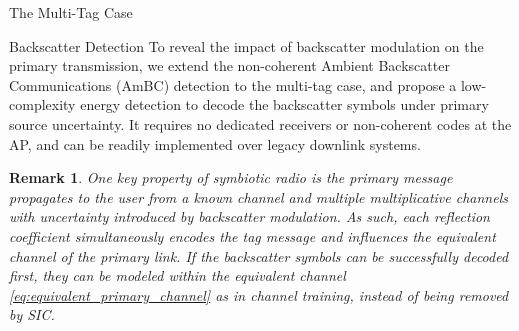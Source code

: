 \documentclass[journal]{IEEEtran}
\newtheorem{remark}{Remark}
\begin{document}
\begin{section}{The Multi-Tag Case}
		\begin{subsection}{Backscatter Detection}
			To reveal the impact of backscatter modulation on the primary transmission, we extend the non-coherent Ambient Backscatter Communications (AmBC) detection \cite{Qian2019} to the multi-tag case, and propose a low-complexity energy detection to decode the backscatter symbols under primary source uncertainty. It requires no dedicated receivers or non-coherent codes at the AP, and can be readily implemented over legacy downlink systems.

			\begin{remark}
				One key property of symbiotic radio is the primary message propagates to the user from a known channel and multiple multiplicative channels with uncertainty introduced by backscatter modulation. As such, each reflection coefficient simultaneously encodes the tag message and influences the equivalent channel of the primary link. If the backscatter symbols can be successfully decoded first, they can be modeled within the equivalent channel \eqref{eq:equivalent_primary_channel} as in channel training, instead of being removed by SIC.
			\end{remark}


\end{subsection}
\end{section}
\end{document}
